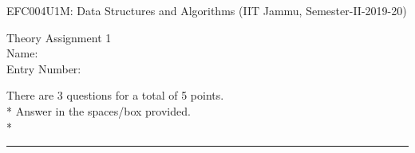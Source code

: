 \documentclass[14pt]{article}
\begin{document}
\large
EFC004U1M: Data Structures and Algorithms (IIT Jammu, Semester-II-2019-20)

\begin{flushright}
Theory Assignment 1 \\
\vspace{1em}
Name: \underline{\hspace{6cm}} \\
\vspace{1em}
Entry Number: \underline{\hspace{6cm}} \\
\end{flushright}

\RaggedRight
There are 3 questions for a total of 5 points. \\*
Answer in the spaces/box provided. \\*
\noindent\rule{\textwidth}{1pt}
\end{document}
